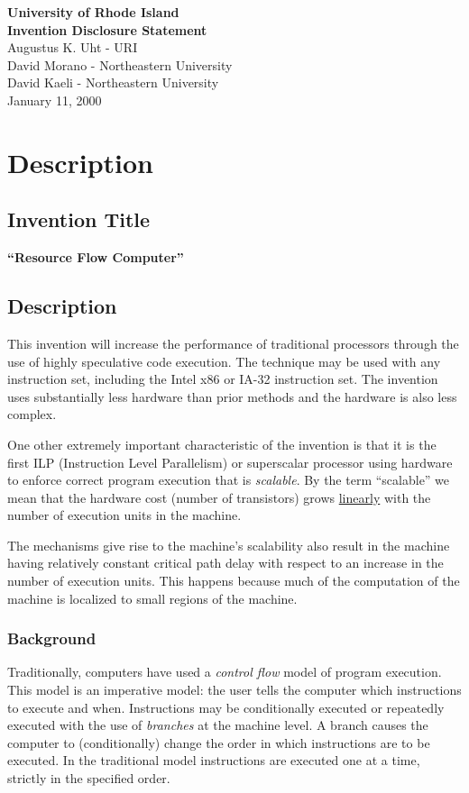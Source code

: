 \documentclass[10pt,dvips]{article}
\begin{document}
\begin{center}
{\Large \bf University of Rhode Island}\\
{\Large \bf Invention Disclosure Statement}\\
\vspace{0.1in}
Augustus K. Uht - URI\\
David Morano - Northeastern University\\
David Kaeli - Northeastern University\\
January 11, 2000
\end{center}

\section{Description}
\subsection{Invention Title}
{\bf ``Resource Flow Computer''}


\subsection{Description}
\label{desc}
This invention will increase the performance of traditional processors through the
use of highly speculative code execution. The technique may be used with any
instruction set, including the Intel x86 or IA-32 instruction set. The invention
uses substantially less hardware than prior methods and the hardware is also less
complex.

One other extremely important characteristic of the invention is that it is
the first ILP (Instruction Level Parallelism) or superscalar processor using
hardware to enforce correct program execution that is {\it scalable}. By the term
``scalable'' we mean that the hardware cost (number of transistors) grows
\underline{linearly} with the number of execution units in the machine.

The mechanisms give rise to the machine's scalability also result in the machine
having relatively constant critical path delay with respect to an increase in the
number of execution units. This happens because much of the computation of the
machine is localized to small regions of the machine.


\subsubsection{Background}
\label{background}
Traditionally, computers have used a {\it control flow} model of program execution.
This model is an imperative model: the user tells the computer which instructions to
execute and when. Instructions may be conditionally executed or repeatedly
executed with the use of {\it branches} at the machine level. A branch causes
the computer to (conditionally) change the order in which instructions are
to be executed. In the traditional model instructions are executed one at a time,
strictly in the specified order.
\end{document}
